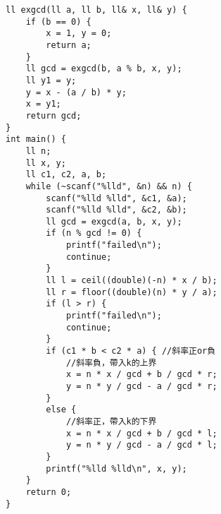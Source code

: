 \begin{lstlisting}
ll exgcd(ll a, ll b, ll& x, ll& y) {
    if (b == 0) {
        x = 1, y = 0;
        return a;
    }
    ll gcd = exgcd(b, a % b, x, y);
    ll y1 = y;
    y = x - (a / b) * y;
    x = y1;
    return gcd;
}
int main() {
    ll n;
    ll x, y;
    ll c1, c2, a, b;
    while (~scanf("%lld", &n) && n) {
        scanf("%lld %lld", &c1, &a);
        scanf("%lld %lld", &c2, &b);
        ll gcd = exgcd(a, b, x, y);
        if (n % gcd != 0) {
            printf("failed\n");
            continue;
        }
        ll l = ceil((double)(-n) * x / b);
        ll r = floor((double)(n) * y / a);
        if (l > r) {
            printf("failed\n");
            continue;
        }
        if (c1 * b < c2 * a) { //斜率正or負
            //斜率負，帶入k的上界
            x = n * x / gcd + b / gcd * r;
            y = n * y / gcd - a / gcd * r;
        }
        else {
            //斜率正，帶入k的下界
            x = n * x / gcd + b / gcd * l;
            y = n * y / gcd - a / gcd * l;
        }
        printf("%lld %lld\n", x, y);
    }
    return 0;
}
\end{lstlisting}